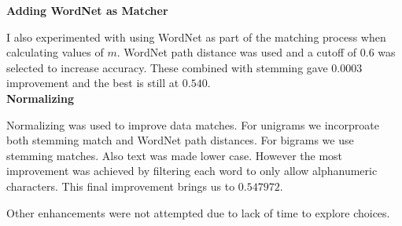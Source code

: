 \documentclass{article}
\begin{document}
{\bf Adding WordNet as Matcher}

I also experimented with using WordNet as part of the matching process when calculating values of $m$. WordNet path distance was used and a cutoff of $0.6$ was selected to increase accuracy. These combined with stemming gave $0.0003$ improvement and the best is still at $0.540$.\\

{\bf Normalizing}

Normalizing was used to improve data matches. For unigrams we incorproate both stemming match and WordNet path distances. For bigrams we use stemming matches. Also text was made lower case. However the most improvement was achieved by filtering each word to only allow alphanumeric characters. This final improvement brings us to $0.547972$.

Other enhancements were not attempted due to lack of time to explore choices. 


\end{document}
